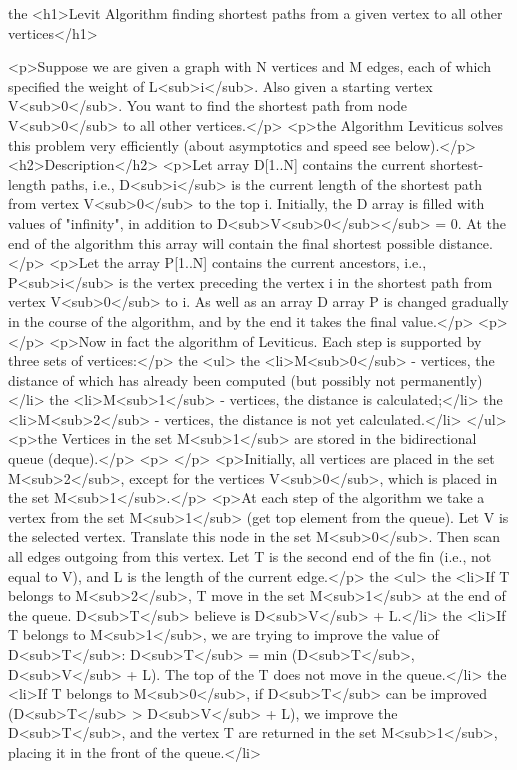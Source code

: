 the <h1>Levit Algorithm finding shortest paths from a given vertex to all other vertices</h1>

<p>Suppose we are given a graph with N vertices and M edges, each of which specified the weight of L<sub>i</sub>. Also given a starting vertex V<sub>0</sub>. You want to find the shortest path from node V<sub>0</sub> to all other vertices.</p>
<p>the Algorithm Leviticus solves this problem very efficiently (about asymptotics and speed see below).</p>
<h2>Description</h2>
<p>Let array D[1..N] contains the current shortest-length paths, i.e., D<sub>i</sub> is the current length of the shortest path from vertex V<sub>0</sub> to the top i. Initially, the D array is filled with values of "infinity", in addition to D<sub>V<sub>0</sub></sub> = 0. At the end of the algorithm this array will contain the final shortest possible distance.</p>
<p>Let the array P[1..N] contains the current ancestors, i.e., P<sub>i</sub> is the vertex preceding the vertex i in the shortest path from vertex V<sub>0</sub> to i. As well as an array D array P is changed gradually in the course of the algorithm, and by the end it takes the final value.</p>
<p> </p>
<p>Now in fact the algorithm of Leviticus. Each step is supported by three sets of vertices:</p>
the <ul>
the <li>M<sub>0</sub> - vertices, the distance of which has already been computed (but possibly not permanently)</li>
the <li>M<sub>1</sub> - vertices, the distance is calculated;</li>
the <li>M<sub>2</sub> - vertices, the distance is not yet calculated.</li>
</ul>
<p>the Vertices in the set M<sub>1</sub> are stored in the bidirectional queue (deque).</p>
<p> </p>
<p>Initially, all vertices are placed in the set M<sub>2</sub>, except for the vertices V<sub>0</sub>, which is placed in the set M<sub>1</sub>.</p>
<p>At each step of the algorithm we take a vertex from the set M<sub>1</sub> (get top element from the queue). Let V is the selected vertex. Translate this node in the set M<sub>0</sub>. Then scan all edges outgoing from this vertex. Let T is the second end of the fin (i.e., not equal to V), and L is the length of the current edge.</p>
the <ul>
the <li>If T belongs to M<sub>2</sub>, T move in the set M<sub>1</sub> at the end of the queue. D<sub>T</sub> believe is D<sub>V</sub> + L.</li>
the <li>If T belongs to M<sub>1</sub>, we are trying to improve the value of D<sub>T</sub>: D<sub>T</sub> = min (D<sub>T</sub>, D<sub>V</sub> + L). The top of the T does not move in the queue.</li>
the <li>If T belongs to M<sub>0</sub>, if D<sub>T</sub> can be improved (D<sub>T</sub> > D<sub>V</sub> + L), we improve the D<sub>T</sub>, and the vertex T are returned in the set M<sub>1</sub>, placing it in the front of the queue.</li>
